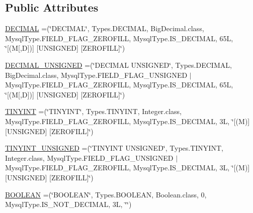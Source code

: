 \subsection*{Public Attributes}
\begin{DoxyCompactItemize}
\item 
\mbox{\hyperlink{enumcom_1_1mysql_1_1cj_1_1_mysql_type_a90f5401b1fa7f31d2d384156fa552e2c}{D\+E\+C\+I\+M\+AL}} =(\char`\"{}D\+E\+C\+I\+M\+AL\char`\"{}, Types.\+D\+E\+C\+I\+M\+AL, Big\+Decimal.\+class, Mysql\+Type.\+F\+I\+E\+L\+D\+\_\+\+F\+L\+A\+G\+\_\+\+Z\+E\+R\+O\+F\+I\+LL, Mysql\+Type.\+I\+S\+\_\+\+D\+E\+C\+I\+M\+AL, 65\+L, \char`\"{}\mbox{[}(\+M\mbox{[},\+D\mbox{]})\mbox{]} \mbox{[}\+U\+N\+S\+I\+G\+N\+E\+D\mbox{]} \mbox{[}\+Z\+E\+R\+O\+F\+I\+L\+L\mbox{]}\char`\"{})
\item 
\mbox{\hyperlink{enumcom_1_1mysql_1_1cj_1_1_mysql_type_acf73450623fafadf72095ff8bcab078e}{D\+E\+C\+I\+M\+A\+L\+\_\+\+U\+N\+S\+I\+G\+N\+ED}} =(\char`\"{}D\+E\+C\+I\+M\+AL U\+N\+S\+I\+G\+N\+ED\char`\"{}, Types.\+D\+E\+C\+I\+M\+AL, Big\+Decimal.\+class, Mysql\+Type.\+F\+I\+E\+L\+D\+\_\+\+F\+L\+A\+G\+\_\+\+U\+N\+S\+I\+G\+N\+ED $\vert$ Mysql\+Type.\+F\+I\+E\+L\+D\+\_\+\+F\+L\+A\+G\+\_\+\+Z\+E\+R\+O\+F\+I\+LL, Mysql\+Type.\+I\+S\+\_\+\+D\+E\+C\+I\+M\+AL, 65\+L, \char`\"{}\mbox{[}(\+M\mbox{[},\+D\mbox{]})\mbox{]} \mbox{[}\+U\+N\+S\+I\+G\+N\+E\+D\mbox{]} \mbox{[}\+Z\+E\+R\+O\+F\+I\+L\+L\mbox{]}\char`\"{})
\item 
\mbox{\hyperlink{enumcom_1_1mysql_1_1cj_1_1_mysql_type_a87adada40b706dcea9427e4cf5294ed8}{T\+I\+N\+Y\+I\+NT}} =(\char`\"{}T\+I\+N\+Y\+I\+NT\char`\"{}, Types.\+T\+I\+N\+Y\+I\+NT, Integer.\+class, Mysql\+Type.\+F\+I\+E\+L\+D\+\_\+\+F\+L\+A\+G\+\_\+\+Z\+E\+R\+O\+F\+I\+LL, Mysql\+Type.\+I\+S\+\_\+\+D\+E\+C\+I\+M\+AL, 3\+L, \char`\"{}\mbox{[}(\+M)\mbox{]} \mbox{[}\+U\+N\+S\+I\+G\+N\+E\+D\mbox{]} \mbox{[}\+Z\+E\+R\+O\+F\+I\+L\+L\mbox{]}\char`\"{})
\item 
\mbox{\hyperlink{enumcom_1_1mysql_1_1cj_1_1_mysql_type_a1c7d8b3f1301ee4a89e044bb753725ba}{T\+I\+N\+Y\+I\+N\+T\+\_\+\+U\+N\+S\+I\+G\+N\+ED}} =(\char`\"{}T\+I\+N\+Y\+I\+NT U\+N\+S\+I\+G\+N\+ED\char`\"{}, Types.\+T\+I\+N\+Y\+I\+NT, Integer.\+class, Mysql\+Type.\+F\+I\+E\+L\+D\+\_\+\+F\+L\+A\+G\+\_\+\+U\+N\+S\+I\+G\+N\+ED $\vert$ Mysql\+Type.\+F\+I\+E\+L\+D\+\_\+\+F\+L\+A\+G\+\_\+\+Z\+E\+R\+O\+F\+I\+LL, Mysql\+Type.\+I\+S\+\_\+\+D\+E\+C\+I\+M\+AL, 3\+L, \char`\"{}\mbox{[}(\+M)\mbox{]} \mbox{[}\+U\+N\+S\+I\+G\+N\+E\+D\mbox{]} \mbox{[}\+Z\+E\+R\+O\+F\+I\+L\+L\mbox{]}\char`\"{})
\item 
\mbox{\hyperlink{enumcom_1_1mysql_1_1cj_1_1_mysql_type_a009ae534b2a4c9a6e60837c1ca1e53b9}{B\+O\+O\+L\+E\+AN}} =(\char`\"{}B\+O\+O\+L\+E\+AN\char`\"{}, Types.\+B\+O\+O\+L\+E\+AN, Boolean.\+class, 0, Mysql\+Type.\+I\+S\+\_\+\+N\+O\+T\+\_\+\+D\+E\+C\+I\+M\+AL, 3\+L, \char`\"{}\char`\"{})

\end{DoxyCompactItemize}
